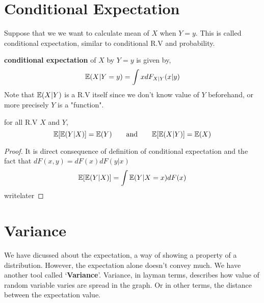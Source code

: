 \section{Conditional Expectation}
Suppose that we we want to calculate mean of $X$ when $Y=y$. This is called conditional expectation, similar to conditional R.V and probability.
\begin{definition} \textbf{conditional expectation} of $X$ by $Y=y$ is given by,
\[{\mathbb{E}}(X | Y=y) = \int x dF_{X|Y}(x|y)\]
Note that ${\mathbb{E}}(X|Y)$ is a R.V itself since we don't know value of $Y$ beforehand, or more precisely $Y$ is a "function".
\end{definition}
\begin{theorem} for all R.V $X$ and $Y$,
    \[{\mathbb{E}}[{\mathbb{E}}(Y|X)] = {\mathbb{E}}(Y) \qquad \text{and} \qquad  {\mathbb{E}}[{\mathbb{E}}(X|Y)] = {\mathbb{E}}(X)\]
    \begin{proof}
        It is direct consequence of definition of conditional expectation and the fact that $dF(x,y) = dF(x)dF(y|x)$
        \[ {\mathbb{E}}[{\mathbb{E}}(Y|X)] = \int {\mathbb{E}}(Y|X=x) dF(x)\]writelater
    \end{proof}
\end{theorem}
\section{Variance}
We have dicussed about the expectation, a way of showing a property of a distribution. However, the expectation alone doesn't convey much. We have another tool called `\textbf{Variance}'.
Variance, in layman terms, describes how value of random variable varies are spread in the graph. Or in other terms, the distance between the expectation value. 
\par

